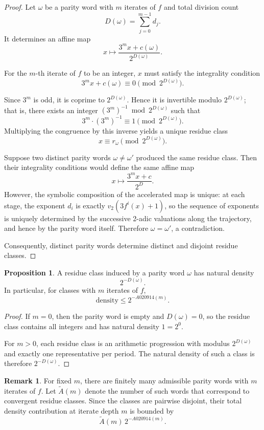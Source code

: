 \documentclass[12pt, oneside]{article}   	%
\numberwithin{equation}{section}          %
\theoremstyle{definition}
\newtheorem{proposition}{Proposition}[section]
\newtheorem*{remark}{Remark}
\begin{document}
\begin{proof}
Let \(\omega\) be a parity word with $m$ iterates of $f$ and total division count
\[
D(\omega) = \sum_{j=0}^{m-1} d_j.
\]
It determines an affine map
\[
x \longmapsto \frac{3^m x + c(\omega)}{2^{D(\omega)}}.
\]

For the $m$-th iterate of $f$ to be an integer, $x$ must satisfy the
integrality condition
\[
3^m x + c(\omega) \equiv 0 \pmod{2^{D(\omega)}}.
\]

Since \(3^m\) is odd, it is coprime to \(2^{D(\omega)}\).  
Hence it is invertible modulo \(2^{D(\omega)}\); that is, there exists an integer
\((3^m)^{-1} \bmod 2^{D(\omega)}\) such that
\[
3^m \cdot (3^m)^{-1} \equiv 1 \pmod{2^{D(\omega)}}.
\] 
Multiplying the congruence by this inverse yields a unique residue class
\[
x \equiv r_\omega \pmod{2^{D(\omega)}}.
\]

Suppose two distinct parity words \(\omega \neq \omega'\) produced the same residue
class. Then their integrality conditions would define the same affine map
\[
x \mapsto \frac{3^m x + c}{2^D}.
\]
However, the symbolic composition of the accelerated map is unique: at each stage,
the exponent \(d_i\) is exactly \(v_2(3 f^i(x)+1)\), so the sequence of exponents is
uniquely determined by the successive 2-adic valuations along the trajectory,
and hence by the parity word itself. Therefore \(\omega = \omega'\), a contradiction.

Consequently, distinct parity words determine distinct and disjoint residue classes.
\end{proof}

\begin{proposition}
A residue class induced by a parity word $\omega$ has natural density
\[
2^{-D(\omega)}.
\]
In particular, for classes with $m$ iterates of $f$,
\[
\text{density} \le 2^{-A020914(m)}.
\]
\end{proposition}

\begin{proof}
If $m=0$, then the parity word is empty and $D(\omega)=0$, so the residue class
contains all integers and has natural density $1 = 2^0$.

For $m>0$, each residue class is an arithmetic progression with modulus $2^{D(\omega)}$
and exactly one representative per period. The natural density of such a class
is therefore $2^{-D(\omega)}$.
\end{proof}

\begin{remark}
For fixed $m$, there are finitely many admissible parity words with $m$ iterates
of $f$. Let $\widetilde A(m)$ denote the number of such words that correspond to
convergent residue classes. Since the classes are pairwise disjoint, their
total density contribution at iterate depth $m$ is bounded by
\[
\widetilde A(m)\,2^{-A020914(m)}.
\]
\end{remark}
\end{document}
